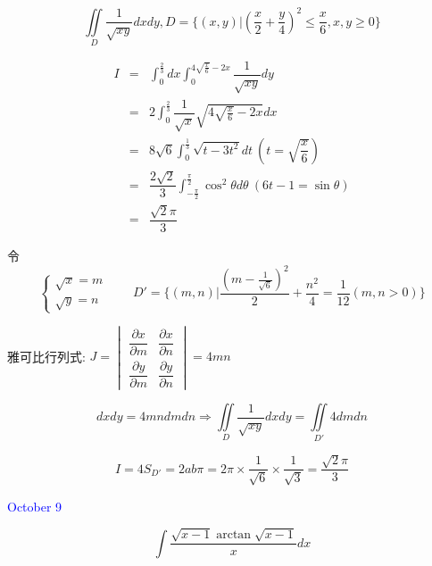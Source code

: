 \begin{solution}
	
\end{solution}


\begin{example}[][Exam: 36.2.2]
	$$\iint\limits_{D}\dfrac{1}{\sqrt{xy}}dxdy, D = \{(x,y)|(\dfrac{x}{2}+\dfrac{y}{4})^2\leq \dfrac{x}{6},x,y\geq 0\}$$
\end{example}
\begin{solution}
	\begin{eqnarray*}
		I & = & \int_{0}^{\frac{2}{3}}dx\int_{0}^{4\sqrt{\frac{x}{6}}-2x}\dfrac{1}{\sqrt{xy}}dy\\
		  & = & 2\int_{0}^{\frac{2}{3}}\dfrac{1}{\sqrt{x}}\sqrt{4\sqrt{\frac{x}{6}}-2x}dx\\
		  & = & 8\sqrt{6}\int_{0}^{\frac{1}{3}}\sqrt{t-3t^2}dt\ (t=\sqrt{\dfrac{x}{6}})\\
		  & = & \dfrac{2\sqrt{2}}{3}\int_{-\frac{\pi}{2}}^{\frac{\pi}{2}}\cos^2\theta d\theta\ (6t-1=\sin\theta)\\
		  & = & \dfrac{\sqrt{2}\pi}{3}
	\end{eqnarray*}
\end{solution}
\begin{anymark}[注]
	令 
	$$\begin{cases}
		\sqrt{x} = m \\
		\sqrt{y} = n
	\end{cases} \quad \quad 
	D' = \{(m,n) |\dfrac{(m-\frac{1}{\sqrt{6}})^2}{2}+\dfrac{n^2}{4}=\dfrac{1}{12}(m,n>0)\}$$
	
	雅可比行列式: $J = 
	\begin{vmatrix}
		\dfrac{\partial x}{\partial m} & \dfrac{\partial x}{\partial n} \\
		\dfrac{\partial y}{\partial m} & \dfrac{\partial y}{\partial n}
	\end{vmatrix} = 4mn$

	$$dxdy = 4mndmdn\Rightarrow \iint\limits_{D}\dfrac{1}{\sqrt{xy}}dxdy = \iint\limits_{D'}4dmdn$$
	
	$$I = 4S_{D'} = 2ab\pi = 2\pi\times\dfrac{1}{\sqrt{6}}\times\dfrac{1}{\sqrt{3}}=\dfrac{\sqrt{2}\pi}{3}$$
\end{anymark}


\textcolor{blue}{October 9}

\begin{example}[][Exam: 36.2.3]
	$$\int \dfrac{\sqrt{x-1}\arctan \sqrt{x-1}}{x}dx$$
\end{example}

